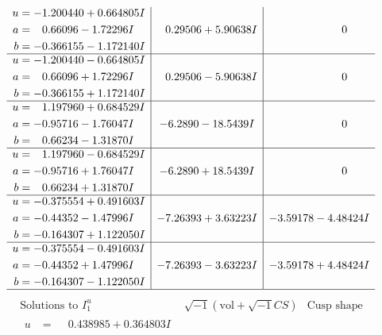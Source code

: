 \documentclass[1p]{elsarticle_modified}
\theoremstyle{definition}
\newcommand{\I}{\sqrt{-1}}
\begin{document}
$$\begin{array}{c|c|c}
\begin{aligned}
u &= -1.200440 + 0.664805 I \\
a &= \phantom{-}0.66096 - 1.72296 I \\
b &= -0.366155 - 1.172140 I\end{aligned}
 & \phantom{-}0.29506 + 5.90638 I & \phantom{-0.000000 } 0 \\ \hline\begin{aligned}
u &= -1.200440 - 0.664805 I \\
a &= \phantom{-}0.66096 + 1.72296 I \\
b &= -0.366155 + 1.172140 I\end{aligned}
 & \phantom{-}0.29506 - 5.90638 I & \phantom{-0.000000 } 0 \\ \hline\begin{aligned}
u &= \phantom{-}1.197960 + 0.684529 I \\
a &= -0.95716 - 1.76047 I \\
b &= \phantom{-}0.66234 - 1.31870 I\end{aligned}
 & -6.2890 - 18.5439 I & \phantom{-0.000000 } 0 \\ \hline\begin{aligned}
u &= \phantom{-}1.197960 - 0.684529 I \\
a &= -0.95716 + 1.76047 I \\
b &= \phantom{-}0.66234 + 1.31870 I\end{aligned}
 & -6.2890 + 18.5439 I & \phantom{-0.000000 } 0 \\ \hline\begin{aligned}
u &= -0.375554 + 0.491603 I \\
a &= -0.44352 - 1.47996 I \\
b &= -0.164307 + 1.122050 I\end{aligned}
 & -7.26393 + 3.63223 I & -3.59178 - 4.48424 I \\ \hline\begin{aligned}
u &= -0.375554 - 0.491603 I \\
a &= -0.44352 + 1.47996 I \\
b &= -0.164307 - 1.122050 I\end{aligned}
 & -7.26393 - 3.63223 I & -3.59178 + 4.48424 I\\
 \hline 
 \end{array}$$\newpage$$\begin{array}{c|c|c}  
\text{Solutions to }I^u_{1}& \I (\text{vol} + \sqrt{-1}CS) & \text{Cusp shape}\\
 \hline 
\begin{aligned}
u &= \phantom{-}0.438985 + 0.364803 I \\

\end{aligned}
\end{array}$$
\end{document}
